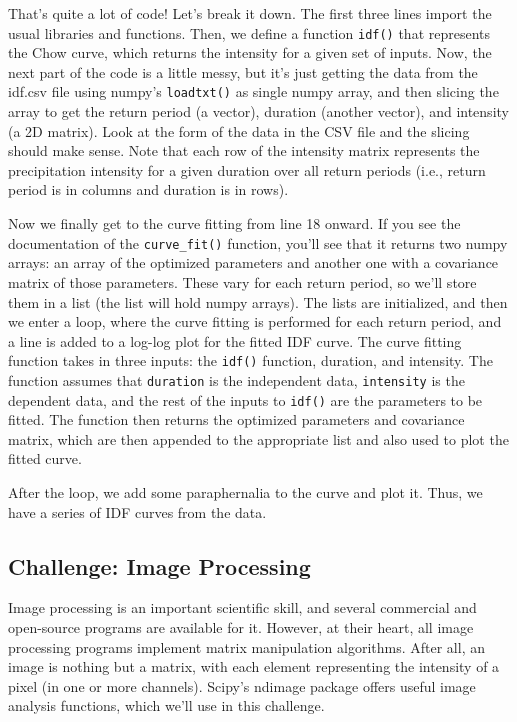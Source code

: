 \documentclass[12pt]{article}
\newcommand{\code}{\texttt}
\begin{document}
That's quite a lot of code! Let's break it down. The first three lines import the usual libraries and functions. Then, we define a function \code{idf()} that represents the Chow curve, which returns the intensity for a given set of inputs. Now, the next part of the code is a little messy, but it's just getting the data from the idf.csv file using numpy's \code{loadtxt()} as single numpy array, and then slicing the array to get the return period (a vector), duration (another vector), and intensity (a 2D matrix). Look at the form of the data in the CSV file and the slicing should make sense. Note that each row of the intensity matrix represents the precipitation intensity for a given duration over all return periods (i.e., return period is in columns and duration is in rows).

Now we finally get to the curve fitting from line 18 onward. If you see the documentation of the \code{curve\_fit()} function, you'll see that it returns two numpy arrays: an array of the optimized parameters and another one with a covariance matrix of those parameters. These vary for each return period, so we'll store them in a list (the list will hold numpy arrays). The lists are initialized, and then we enter a loop, where the curve fitting is performed for each return period, and a line is added to a log-log plot for the fitted IDF curve. The curve fitting function takes in three inputs: the \code{idf()} function, duration, and intensity. The function assumes that \code{duration} is the independent data, \code{intensity} is the dependent data, and the rest of the inputs to \code{idf()} are the parameters to be fitted. The function then returns the optimized parameters and covariance matrix, which are then appended to the appropriate list and also used to plot the fitted curve.

After the loop, we add some paraphernalia to the curve and plot it. Thus, we have a series of IDF curves from the data. 

\subsection{Challenge: Image Processing}
Image processing is an important scientific skill, and several commercial and open-source programs are available for it. However, at their heart, all image processing programs implement matrix manipulation algorithms. After all, an image is nothing but a matrix, with each element representing the intensity of a pixel (in one or more channels). Scipy's ndimage package offers useful image analysis functions, which we'll use in this challenge. 
\end{document}
